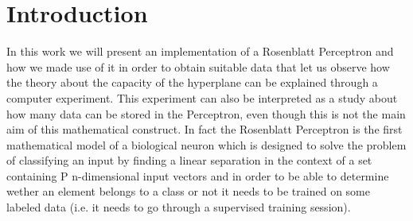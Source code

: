 \section{Introduction}
\label{sec:introduction}

In this work we will present an implementation of a Rosenblatt Perceptron \cite{rosenblatt1958perceptron}
and how we made use of it in order to obtain suitable data that let us observe how the theory about the capacity of the
hyperplane can be explained through a computer experiment. This experiment can also be interpreted as a study about how many
data can be stored in the Perceptron, even though this is not the main aim of this mathematical construct.
In fact the Rosenblatt Perceptron is the first mathematical model of a biological neuron which is designed to
solve the problem of classifying an input by finding a linear separation in the context of a set containing P n-dimensional input vectors
and in order to be able to determine wether an element belongs to a class or not it needs to be trained on some labeled data
(i.e. it needs to go through a supervised training session).
